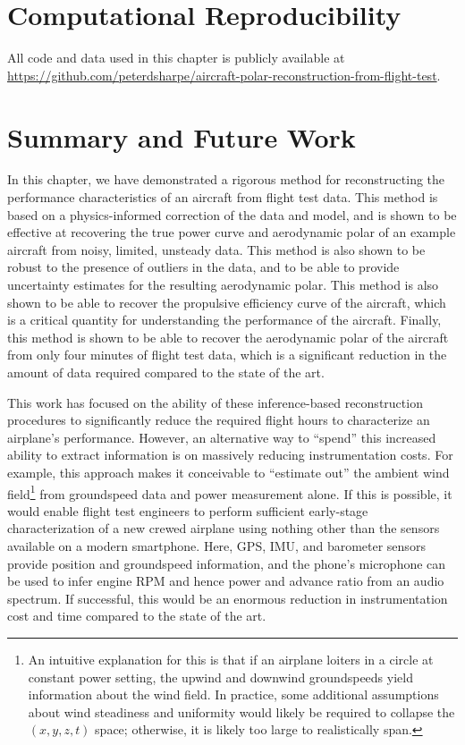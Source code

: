 \section{Computational Reproducibility}

All code and data used in this chapter is publicly available at \url{https://github.com/peterdsharpe/aircraft-polar-reconstruction-from-flight-test}.


\section{Summary and Future Work}
\label{sec:sysid_conclusion}

In this chapter, we have demonstrated a rigorous method for reconstructing the performance characteristics of an aircraft from flight test data. This method is based on a physics-informed correction of the data and model, and is shown to be effective at recovering the true power curve and aerodynamic polar of an example aircraft from noisy, limited, unsteady data. This method is also shown to be robust to the presence of outliers in the data, and to be able to provide uncertainty estimates for the resulting aerodynamic polar. This method is also shown to be able to recover the propulsive efficiency curve of the aircraft, which is a critical quantity for understanding the performance of the aircraft. Finally, this method is shown to be able to recover the aerodynamic polar of the aircraft from only four minutes of flight test data, which is a significant reduction in the amount of data required compared to the state of the art.

This work has focused on the ability of these inference-based reconstruction procedures to significantly reduce the required flight hours to characterize an airplane's performance. However, an alternative way to ``spend'' this increased ability to extract information is on massively reducing instrumentation costs. For example, this approach makes it conceivable to ``estimate out'' the ambient wind field\footnote{An intuitive explanation for this is that if an airplane loiters in a circle at constant power setting, the upwind and downwind groundspeeds yield information about the wind field. In practice, some additional assumptions about wind steadiness and uniformity would likely be required to collapse the $(x, y, z, t)$ space; otherwise, it is likely too large to realistically span.} from groundspeed data and power measurement alone. If this is possible, it would enable flight test engineers to perform sufficient early-stage characterization of a new crewed airplane using nothing other than the sensors available on a modern smartphone. Here, GPS, IMU, and barometer sensors provide position and groundspeed information, and the phone's microphone can be used to infer engine RPM and hence power and advance ratio from an audio spectrum. If successful, this would be an enormous reduction in instrumentation cost and time compared to the state of the art.

